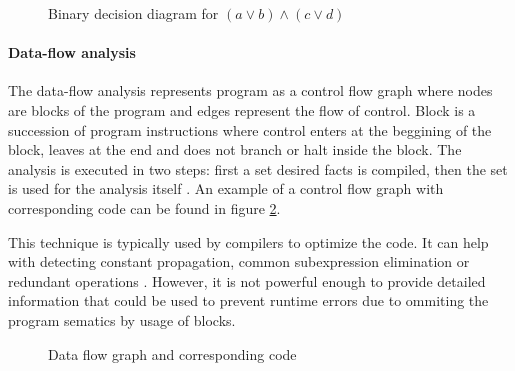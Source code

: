 \documentclass[12pt,final,oneside]{fithesis2}
\begin{document}
\begin{figure}

\centering


\caption{Binary decision diagram for $(a \lor b) \land (c \lor d)$}
\label{fig:bdd}

\end{figure}

\paragraph{Data-flow analysis}

The data-flow analysis represents program as a control flow graph where
nodes are blocks of the program and edges represent the flow of
control. Block is a succession of program instructions where control
enters at the beggining of the block, leaves at the end and does not
branch or halt inside the block. The analysis is executed in two steps:
first a set desired facts is compiled, then the set is used for the
analysis itself \cite{Wogerer05-1}. An example of a control flow graph
with corresponding code can be found in figure \ref{fig:dfg}.

This technique is typically used by compilers to optimize the code. It
can help with detecting constant propagation, common subexpression
elimination or redundant operations \cite{Kildall73-1}. However, it is
not powerful enough to provide detailed information that could be used
to prevent runtime errors due to ommiting the program sematics by usage
of blocks.

\begin{figure}

\centering



\caption{Data flow graph and corresponding code}
\label{fig:dfg}

\end{figure}
\end{document}
